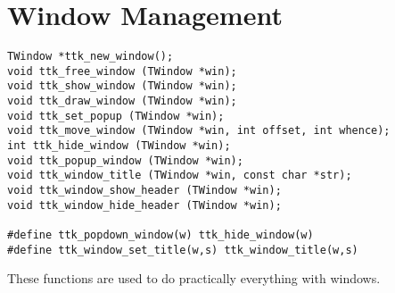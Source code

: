 \documentclass[12pt,letterpaper]{report}
\begin{document}
\section{Window Management}
\begin{verbatim}
TWindow *ttk_new_window();
void ttk_free_window (TWindow *win);
void ttk_show_window (TWindow *win);
void ttk_draw_window (TWindow *win);
void ttk_set_popup (TWindow *win);
void ttk_move_window (TWindow *win, int offset, int whence);
int ttk_hide_window (TWindow *win);
void ttk_popup_window (TWindow *win);
void ttk_window_title (TWindow *win, const char *str);
void ttk_window_show_header (TWindow *win);
void ttk_window_hide_header (TWindow *win);

#define ttk_popdown_window(w) ttk_hide_window(w)
#define ttk_window_set_title(w,s) ttk_window_title(w,s)
\end{verbatim}

These functions are used to do practically everything with windows.
\end{document}
